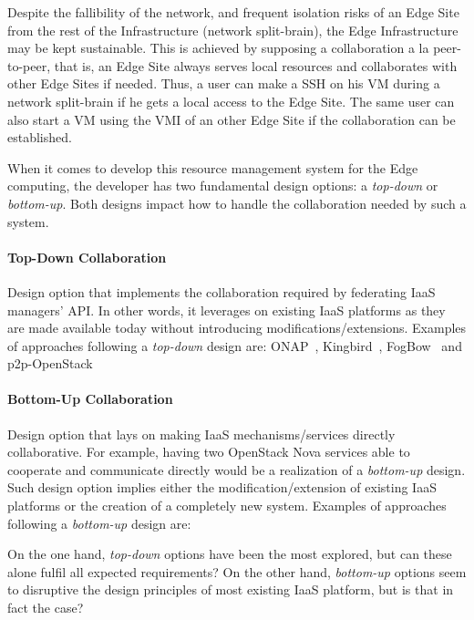 Despite the fallibility of the network, and frequent isolation risks
of an Edge Site from the rest of the Infrastructure (\ie network
split-brain), the Edge Infrastructure may be kept sustainable. This is
achieved by supposing a collaboration a la peer-to-peer, that is, an
Edge Site always serves local resources and collaborates with other
Edge Sites if needed. Thus, a user can make a SSH on his VM during a
network split-brain if he gets a local access to the Edge Site. The
same user can also start a VM using the VMI of an other Edge Site if
the collaboration can be established.

When it comes to develop this resource management system for the Edge
computing, the developer has two fundamental design options: a \emph{top-down} or
\emph{bottom-up}. Both designs impact how to handle the
collaboration needed by such a system.

\paragraph{Top-Down Collaboration}
Design option that implements the collaboration required by
federating IaaS managers' API. In other words, it leverages on existing IaaS platforms as they are made available today without introducing modifications/extensions. Examples of approaches following a \emph{top-down} design are: ONAP~\cite{onap}, Kingbird~\cite{kingbird}, FogBow~\cite{brasileiro2016fogbow} and p2p-OpenStack~\cite{ericsson-p2p}


\paragraph{Bottom-Up Collaboration} Design option that lays on making IaaS mechanisms/services directly collaborative. For example, having two OpenStack Nova services able to cooperate and communicate directly would be a realization of a \emph{bottom-up} design. Such design option implies either the modification/extension of existing IaaS platforms or the creation of a completely new system. Examples of approaches following a \emph{bottom-up} design are:

On the one hand, \emph{top-down} options have been the most explored, but can these alone fulfil all expected requirements? On the other hand, \emph{bottom-up} options seem to disruptive the design principles of most existing IaaS platform, but is that in fact the case?
